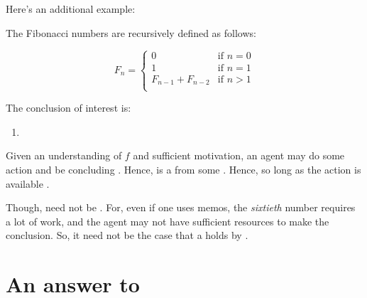 \begin{note}
  Here's an additional example:

  \begin{scenario}%
    \label{scen:fc:fib}%
    The Fibonacci numbers are recursively defined as follows:

    \[
      F_{n} = \left\{
        \begin{array}{ll}
          0 & \text{if } n = 0 \\
          1 & \text{if } n = 1 \\
          F_{n-1} + F_{n-2} & \text{if } n > 1 \\
        \end{array}
      \right.
    \]
  \end{scenario}

  \noindent%
  The conclusion of interest is:
  \begin{enumerate}[label=C\thescenarioCounter., ref=(C\thescenarioCounter)]
  \item
    \label{scen:fc:fib:c}
  \end{enumerate}
  Given an understanding of \(f\) and sufficient motivation, an agent may do some action and be concluding .
  Hence,  is a \fc{} from some \pool{}.
  Hence, so long as the action is available .

  Though,  need not be .
  For, even if one uses memos, the \emph{sixtieth} number requires a lot of work, and the agent may not have sufficient resources to make the conclusion.
  So, it need not be the case that a \fingfr{} holds by \supportII{}.
\end{note}


\section{An answer to \qWhy{}}


